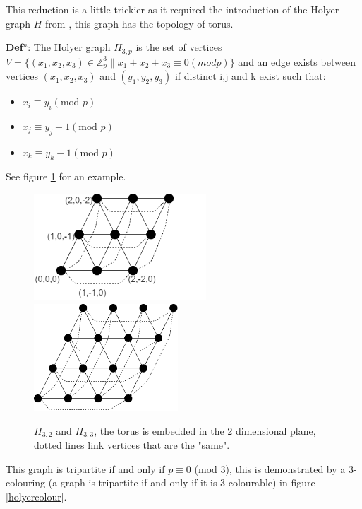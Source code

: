 \documentclass[a4paper,11pt]{report}
\newcounter{col}
\begin{document}
This reduction is a little trickier as it required the introduction of the Holyer graph $H$ from \cite{holyer}, this graph has the topology of torus.

\textbf{Def$^n$}: The Holyer graph $H_{3,p}$ is the set of vertices $V=\{(x_1,x_2,x_3)\in \mathbb{Z}_p^3 \| x_1+x_2+x_3 \equiv 0 (mod p)\}$ and an edge exists between vertices $(x_1,x_2,x_3)$ and $(y_1,y_2,y_3)$ if distinct i,j and k exist such that:
\begin{itemize}
\item $x_i\equiv y_i (\text{mod }p)$
\item $x_j\equiv y_j+1 (\text{mod }p)$
\item $x_k\equiv y_k-1 (\text{mod }p)$
\end{itemize}
See figure \ref{holyer} for an example.

\begin{figure}[h!]
\begin{center}
		\includegraphics[height=40mm]{figures/holyer_coord.png}
		\includegraphics[height=40mm]{figures/holyer_3_4.png}
\end{center}
		\caption{$H_{3,2} $ and $H_{3,3}$, the torus is embedded in the 2 dimensional plane, dotted lines link vertices that are the "same".}
		\label{holyer}
\end{figure}

This graph is tripartite if and only if $p\equiv 0 $ (mod 3), this is demonstrated by a 3-colouring (a graph is tripartite if and only if it is 3-colourable) in figure \ref{holyercolour}.
\end{document}

